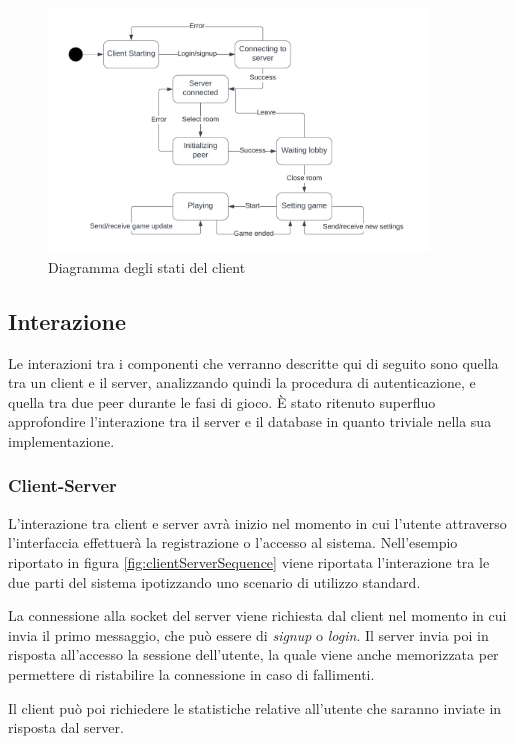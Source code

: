\begin{figure}[H]
\centering
\includegraphics[width=0.9\textwidth]{img/draw/uml_state_client.png}
\caption{Diagramma degli stati del client}
\label{fig:clientStates}
\end{figure}

\subsection{Interazione}

Le interazioni tra i componenti che verranno descritte qui di seguito sono quella tra un client e il server, analizzando quindi la procedura di autenticazione, e quella tra due peer durante le fasi di gioco. È stato ritenuto superfluo approfondire l'interazione tra il server e il database in quanto triviale nella sua implementazione.

\subsubsection{Client-Server}
L'interazione tra client e server avrà inizio nel momento in cui l'utente attraverso l'interfaccia effettuerà la registrazione o l'accesso al sistema.
Nell'esempio riportato in figura \ref{fig:clientServerSequence} viene riportata l'interazione tra le due parti del sistema ipotizzando uno scenario di utilizzo standard.

La connessione alla socket del server viene richiesta dal client nel momento in cui invia il primo messaggio, che può essere di \emph{signup} o \emph{login}. Il server invia poi in risposta all'accesso la sessione dell'utente, la quale viene anche memorizzata per permettere di ristabilire la connessione in caso di fallimenti.

Il client può poi richiedere le statistiche relative all'utente che saranno inviate in risposta dal server.

